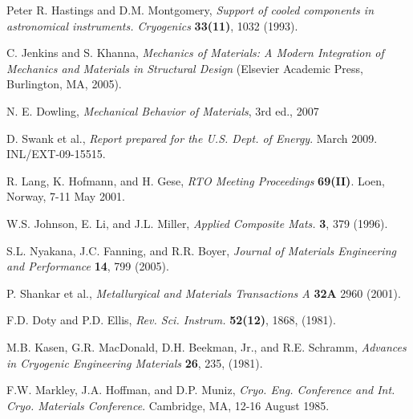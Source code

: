 \documentclass[final]{svjour2}
\begin{document}
\begin{thebibliography}{99}

Peter R. Hastings and D.M. Montgomery, {\it Support of cooled components in astronomical instruments. Cryogenics} \textbf{33(11)}, 1032 (1993).

C. Jenkins and S. Khanna, {\it Mechanics of Materials: A Modern Integration of Mechanics and Materials in Structural Design} (Elsevier Academic Press, Burlington, MA, 2005).

N. E. Dowling, {\it Mechanical Behavior of Materials}, 3rd ed., 2007



D. Swank et al., {\it Report prepared for the U.S. Dept. of Energy}. March 2009. INL/EXT-09-15515.

R. Lang, K. Hofmann, and H. Gese, {\it RTO Meeting Proceedings} \textbf{69(II)}. Loen, Norway, 7-11 May 2001.

W.S. Johnson, E. Li, and J.L. Miller, {\it Applied Composite Mats.} \textbf{3}, 379 (1996).

S.L. Nyakana, J.C. Fanning, and R.R. Boyer, {\it Journal of Materials Engineering and Performance} \textbf{14}, 799 (2005).

P. Shankar et al., {\it Metallurgical and Materials Transactions A} \textbf{32A} 2960 (2001).

F.D. Doty and P.D. Ellis, {\it Rev. Sci. Instrum.} \textbf{52(12)}, 1868, (1981).

M.B. Kasen, G.R. MacDonald, D.H. Beekman, Jr., and R.E. Schramm, {\it Advances in Cryogenic Engineering Materials} \textbf{26}, 235, (1981).

F.W. Markley, J.A. Hoffman, and D.P. Muniz, {\it Cryo. Eng. Conference and Int. Cryo. Materials Conference}. Cambridge, MA, 12-16 August 1985.


\end{thebibliography}
\end{document}
